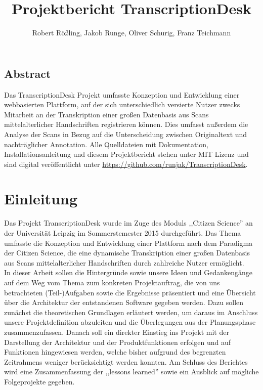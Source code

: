 \documentclass{article}
\title{Projektbericht TranscriptionDesk}
\author{Robert Rößling, Jakob Runge, Oliver Schurig, Franz Teichmann}
\begin{document}

\maketitle

\subsection*{Abstract}
Das TranscriptionDesk Projekt umfasste Konzeption und Entwicklung einer webbasierten Plattform, auf der sich unterschiedlich versierte Nutzer zwecks Mitarbeit an der Transkription einer großen Datenbasis aus Scans mittelalterlicher Handschriften registrieren können. Dies umfasst außerdem die Analyse der Scans in Bezug auf die Unterscheidung zwischen Originaltext und nachträglicher Annotation.
Alle Quelldateien mit Dokumentation, Installationsanleitung und diesem Projektbericht stehen unter MIT Lizenz und sind digital veröffentlicht unter \url{https://github.com/runjak/TranscriptionDesk}. 

\tableofcontents
\newpage

\section{Einleitung}
Das Projekt TranscriptionDesk wurde im Zuge des Moduls ,,Citizen Science'' an der Universität Leipzig im Sommerstemester 2015 durchgeführt. Das Thema umfasste die Konzeption und Entwicklung einer Plattform nach dem Paradigma der Citizen Science, die eine dynamische Transkription einer großen Datenbasis aus Scans mittelalterlicher Handschriften durch zahlreiche Nutzer ermöglicht. \\
In dieser Arbeit sollen die Hintergründe sowie unsere Ideen und Gedankengänge auf dem Weg vom Thema zum konkreten Projektauftrag, die von uns betrachteten (Teil-)Aufgaben sowie die Ergebnisse präsentiert und eine Übersicht über die Architektur der entstandenen Software gegeben werden. Dazu sollen zunächst die theoretischen Grundlagen erläutert werden, um daraus im Anschluss unsere Projektdefinition abzuleiten und die Überlegungen aus der Planungsphase zusammenzufassen.
Danach soll ein direkter Einstieg ins Projekt mit der Darstellung der Architektur und der Produktfunktionen erfolgen und auf Funktionen hingewiesen werden, welche bisher aufgrund des begrenzten Zeitrahmens weniger berücksichtigt werden konnten.
Am Schluss des Berichtes wird eine Zusammenfassung der ,,lessons learned'' sowie ein Ausblick auf mögliche Folgeprojekte gegeben.
\end{document}
